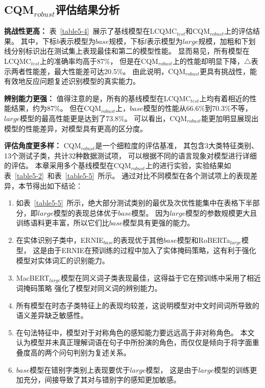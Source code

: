 \subsection{CQM$_{robust}$评估结果分析}


\textbf{挑战性更高：}
表~\ref{table5-4}~展示了基线模型在LCQMC$_{test}$和CQM$_{robust}$上的评估结果。
其中，下标$b$表示模型为$base$规模，下标$l$表示模型为$large$规模，加粗和下划线分别标识出在测试集上表现最佳和第二的模型性能。
显而易见，所有模型在LCQMC$_{test}$上的准确率均高于87\%，
但是在CQM$_{robust}$上的性能却明显下降，$\triangle$表示两者性能差，最大性能差可达20.5\%。
由此说明，CQM$_{robust}$更具有挑战性，能有效地反应问题复述识别模型的真实能力。



\textbf{辨别能力更强：}
值得注意的是，所有的基线模型在LCQMC$_{test}$上均有着相近的性能结果，约为87\%。
但在CQM$_{robust}$上，$base$模型的性能从66.6\%到70.3\%不等，$large$模型的最高性能更是达到了73.8\%。
可以看出，CQM$_{robust}$能更加明显展现出模型的性能差异，对模型具有更高的区分度。

\textbf{评估角度更多样：}
CQM$_{robust}$是一个细粒度的评估基准，
其包含3大类特征类别、13个测试子类，共计32种数据测试项，
可以根据不同的语言现象对模型进行详细的评估。
本章采用多个基线模型在CQM$_{robust}$上的进行实验，实验结果如表~\ref{table5-2}~和表~\ref{table5-5}~所示。
通过对比不同模型在各个测试项上的表现差异，本节得出如下结论：



\begin{enumerate}
    \item 如表~\ref{table5-5}~所示，绝大部分测试类别的最优及次优性能集中在表格下半部分，即$large$模型的表现总体优于$base$模型。
    因为$large$模型的参数规模更大且训练语料更丰富，所以它们比$base$模型具有更强的能力。
    \item 在实体识别子类中，ERNIE$_{base}$的表现优于其他${base}$模型和RoBERTa$_{large}$模型，
    这是由于ERNIE在预训练的过程中加入了实体掩码策略，这有利于强化模型对实体词汇的识别能力。
    \item MacBERT$_{large}$模型在同义词子类表现最佳，这得益于它在预训练中采用了相近词掩码策略
    强化了模型对同义词的辨别能力。
    \item 所有模型在时态子类特征上的表现均较差，这说明模型对中文时间词所导致的语义差异缺乏敏感性。
    \item 在句法特征中，模型对于对称角色的感知能力要远远高于非对称角色。
    本文认为模型并未真正理解词语在句子中所扮演的角色，而仅仅是倾向于将字面重叠度高的两个问句判别为复述关系。
    \item ${base}$模型在错别字类别上表现要优于${large}$模型，
    这是由于${large}$模型的训练更加充分，间接导致了其对与错别字的感知更加敏感。
\end{enumerate}


